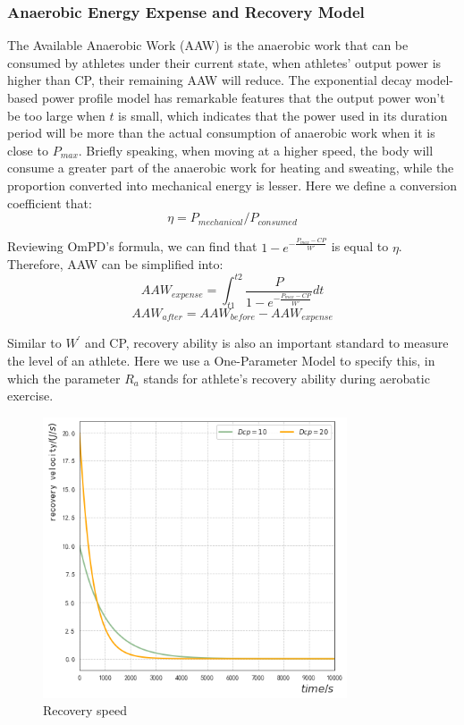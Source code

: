 \documentclass{mcmthesis}
\begin{document}
\subsubsection{Anaerobic Energy Expense and Recovery Model}
\par
The Available Anaerobic Work (AAW) is the anaerobic work that can be consumed by athletes under their current state, when athletes' output power is higher than CP, their remaining AAW will reduce. 
The exponential decay model-based power profile model has remarkable features that the output power won't be too large when $t$ is small, which indicates that the power used in its duration period will be more than the actual consumption of anaerobic work when it is close to $P_{max}$. Briefly speaking, when moving at a higher speed, the body will consume a greater part of the anaerobic work for heating and sweating, while the proportion converted into mechanical energy is lesser. Here we define a conversion coefficient that:
\begin{equation}
    \eta =P_{mechanical}/P_{consumed}
\end{equation}
\par
Reviewing OmPD's formula, we can find that $1-e^{-\frac{P_{max}-CP}{W'}}$ is equal to $\eta$. Therefore, AAW can be simplified into:
\begin{equation}
    AAW_{expense}=\int_{t1}^{t2}\frac{P}{1-e^{-\frac{P_{max}-CP}{W'}}}dt
\end{equation}
\begin{equation}
    AAW_{after}=AAW_{before}-AAW_{expense}
\end{equation}
\par
Similar to $W^\prime$ and CP, recovery ability is also an important standard to measure the level of an athlete. Here we use a One-Parameter Model to specify this, in which the parameter $R_a$ stands for athlete's recovery ability during aerobatic exercise. 
\begin{figure}[H]
\small
\centering
\includegraphics[width=9cm]{mcmthesis/figures/recovery -V.png}
\caption{Recovery speed} 
\label{fig:recovery}
\end{figure}
\end{document}

